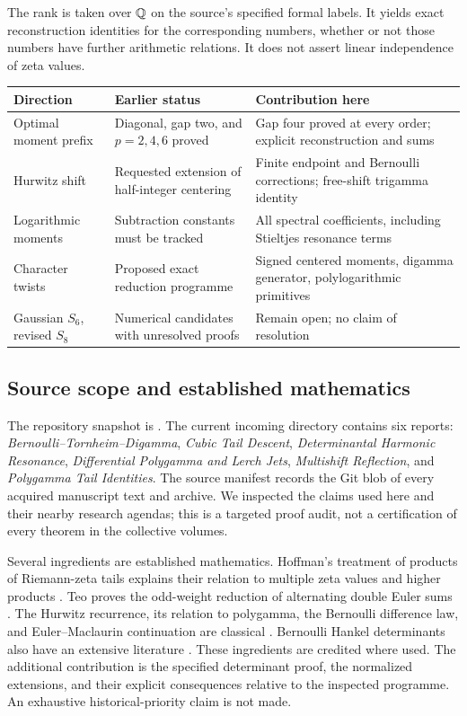 The rank is taken over $\mathbb Q$ on the source's specified formal labels.
It yields exact reconstruction identities for the corresponding
numbers, whether or not those numbers have further arithmetic
relations. It does not assert linear independence of zeta values.

\begin{center}
\begin{tabular}{@{}>{\raggedright\arraybackslash}p{}>{\raggedright\arraybackslash}p{}>{\raggedright\arraybackslash}p{}@{}}
\toprule
Direction & Earlier status & Contribution here \\
\midrule
Optimal moment prefix & Diagonal, gap two, and $p=2,4,6$ proved &
Gap four proved at every order; explicit reconstruction and sums \\
Hurwitz shift & Requested extension of half-integer centering &
Finite endpoint and Bernoulli corrections; free-shift trigamma identity \\
Logarithmic moments & Subtraction constants must be tracked &
All spectral coefficients, including Stieltjes resonance terms \\
Character twists & Proposed exact reduction programme &
Signed centered moments, digamma generator, polylogarithmic primitives \\
Gaussian $S_6$, revised $S_8$ & Numerical candidates with unresolved proofs &
Remain open; no claim of resolution \\
\bottomrule
\end{tabular}
\end{center}

\subsection{Source scope and established mathematics}

The repository snapshot is \cite{Repo}. The current incoming directory
contains six reports: \emph{Bernoulli--Tornheim--Digamma},
\emph{Cubic Tail Descent}, \emph{Determinantal Harmonic Resonance},
\emph{Differential Polygamma and Lerch Jets},
\emph{Multishift Reflection}, and \emph{Polygamma Tail Identities}.
The source manifest records the Git blob of every acquired manuscript
text and archive. We inspected the claims used here and their nearby
research agendas; this is a targeted proof audit, not a certification
of every theorem in the collective volumes.

Several ingredients are established mathematics. Hoffman's treatment
of products of Riemann-zeta tails explains their relation to multiple
zeta values and higher products \cite{Hoffman}. Teo proves the
odd-weight reduction of alternating double Euler sums \cite{Teo}.
The Hurwitz recurrence, its relation to polygamma, the Bernoulli
difference law, and Euler--Maclaurin continuation are classical
\cite{DLMF}. Bernoulli Hankel determinants also have an extensive
literature \cite{DilcherJiu}. These ingredients are credited where
used. The additional contribution is the specified determinant proof,
the normalized extensions, and their explicit consequences relative
to the inspected programme. An exhaustive historical-priority claim
is not made.

